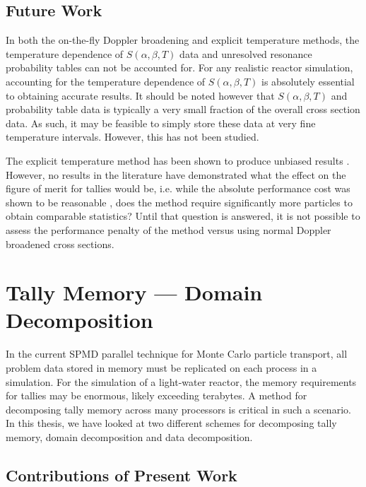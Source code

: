 \subsection{Future Work}

In both the on-the-fly Doppler broadening and explicit temperature methods, the
temperature dependence of $S(\alpha,\beta,T)$ data and unresolved resonance
probability tables can not be accounted for. For any realistic reactor
simulation, accounting for the temperature dependence of $S(\alpha,\beta,T)$ is
absolutely essential to obtaining accurate results. It should be noted however
that $S(\alpha,\beta,T)$ and probability table data is typically a very small
fraction of the overall cross section data. As such, it may be feasible to
simply store these data at very fine temperature intervals. However, this has
not been studied.

The explicit temperature method has been shown to produce unbiased results
\cite{nse-viitanen-2012}. However, no results in the literature have
demonstrated what the effect on the figure of merit for tallies would be,
i.e. while the absolute performance cost was shown to be reasonable
\cite{physor-viitanen-2012}, does the method require significantly more
particles to obtain comparable statistics? Until that question is answered, it
is not possible to assess the performance penalty of the method versus using
normal Doppler broadened cross sections.

\section{Tally Memory --- Domain Decomposition}

In the current SPMD parallel technique for Monte Carlo particle transport, all
problem data stored in memory must be replicated on each process in a
simulation. For the simulation of a light-water reactor, the memory requirements
for tallies may be enormous, likely exceeding terabytes. A method for
decomposing tally memory across many processors is critical in such a
scenario. In this thesis, we have looked at two different schemes for
decomposing tally memory, domain decomposition and data decomposition.

\subsection{Contributions of Present Work}

